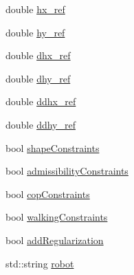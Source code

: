 \begin{DoxyCompactItemize}
\item 
double \hyperlink{structMIQPParameters_a0346212871459ae33b79af6f9af49d5f}{hx\-\_\-ref}
\item 
double \hyperlink{structMIQPParameters_a09fe82db83af3f8ab0e891968daa7996}{hy\-\_\-ref}
\item 
double \hyperlink{structMIQPParameters_a97a8deb8aeda727c99dc501b4516a24e}{dhx\-\_\-ref}
\item 
double \hyperlink{structMIQPParameters_a816bb15b6417ac8387adbaac2f74e198}{dhy\-\_\-ref}
\item 
double \hyperlink{structMIQPParameters_a71dab92bc2eebbdf5e2d592c092e7f52}{ddhx\-\_\-ref}
\item 
double \hyperlink{structMIQPParameters_a996553605ecfefa749bde01bc4e7b2a9}{ddhy\-\_\-ref}
\item 
bool \hyperlink{structMIQPParameters_a718ac69205eb5fbb51f58cd59176a3ff}{shape\-Constraints}
\item 
bool \hyperlink{structMIQPParameters_ae8e541722b3e3664ab516676aa1c16be}{admissibility\-Constraints}
\item 
bool \hyperlink{structMIQPParameters_a3a0fd04f9e8767097e44e02a740796bc}{cop\-Constraints}
\item 
bool \hyperlink{structMIQPParameters_af7cbaa08836e17417f9f5c170b55f1bc}{walking\-Constraints}
\item 
bool \hyperlink{structMIQPParameters_a7e5417e18e6797739def8f916c3efc40}{add\-Regularization}
\item 
std\-::string \hyperlink{structMIQPParameters_af2f4673b548e119f30a7e90baac268f5}{robot}
\end{DoxyCompactItemize}


